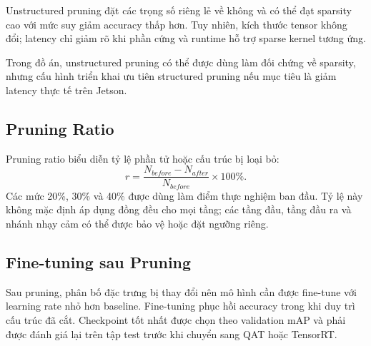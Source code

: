 Unstructured pruning đặt các trọng số riêng lẻ về không và có thể đạt sparsity
cao với mức suy giảm accuracy thấp hơn. Tuy nhiên, kích thước tensor không đổi;
latency chỉ giảm rõ khi phần cứng và runtime hỗ trợ sparse kernel tương ứng.

Trong đồ án, unstructured pruning có thể được dùng làm đối chứng về sparsity,
nhưng cấu hình triển khai ưu tiên structured pruning nếu mục tiêu là giảm latency
thực tế trên Jetson.

\subsection{Pruning Ratio}

Pruning ratio biểu diễn tỷ lệ phần tử hoặc cấu trúc bị loại bỏ:
\begin{equation}
  r=\frac{N_{before}-N_{after}}{N_{before}}\times 100\%.
\end{equation}
Các mức 20\%, 30\% và 40\% được dùng làm điểm thực nghiệm ban đầu. Tỷ lệ này
không mặc định áp dụng đồng đều cho mọi tầng; các tầng đầu, tầng đầu ra và nhánh
nhạy cảm có thể được bảo vệ hoặc đặt ngưỡng riêng.

\subsection{Fine-tuning sau Pruning}

Sau pruning, phân bố đặc trưng bị thay đổi nên mô hình cần được fine-tune với
learning rate nhỏ hơn baseline. Fine-tuning phục hồi accuracy trong khi duy trì
cấu trúc đã cắt. Checkpoint tốt nhất được chọn theo validation mAP và phải được
đánh giá lại trên tập test trước khi chuyển sang QAT hoặc TensorRT.